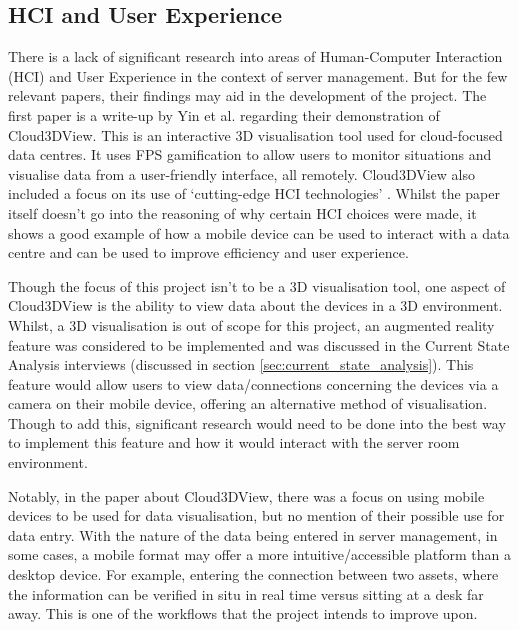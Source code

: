 \documentclass [11pt,a4paper]{article}
\begin{document}
\subsection{HCI and User Experience}
\label{sec:HCI}
There is a lack of significant research into areas of Human-Computer Interaction (HCI) and User Experience in the context of server management. But for the few relevant papers, their findings may aid in the development of the project. The first paper is a write-up by Yin et al. \cite{cloud3dview} regarding their demonstration of Cloud3DView. This is an interactive 3D visualisation tool used for cloud-focused data centres. It uses FPS gamification to allow users to monitor situations and visualise data from a user-friendly interface, all remotely. Cloud3DView also included a focus on its use of `cutting-edge HCI technologies' \cite{cloud3dview}. Whilst the paper itself doesn't go into the reasoning of why certain HCI choices were made, it shows a good example of how a mobile device can be used to interact with a data centre and can be used to improve efficiency and user experience. 

Though the focus of this project isn't to be a 3D visualisation tool, one aspect of Cloud3DView is the ability to view data about the devices in a 3D environment. Whilst, a 3D visualisation is out of scope for this project, an augmented reality feature was considered to be implemented and was discussed in the Current State Analysis interviews (discussed in section \ref{sec:current_state_analysis}). This feature would allow users to view data/connections concerning the devices via a camera on their mobile device, offering an alternative method of visualisation. Though to add this, significant research would need to be done into the best way to implement this feature and how it would interact with the server room environment.

Notably, in the paper about Cloud3DView, there was a focus on using mobile devices to be used for data visualisation, but no mention of their possible use for data entry. With the nature of the data being entered in server management, in some cases, a mobile format may offer a more intuitive/accessible platform than a desktop device. For example, entering the connection between two assets, where the information can be verified in situ in real time versus sitting at a desk far away. This is one of the workflows that the project intends to improve upon.
\end{document}
